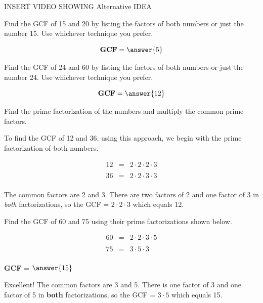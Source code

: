 \documentclass{ximera}[font=12pt]  %
\begin{document}
INSERT VIDEO SHOWING Alternative IDEA


\begin{problem}
Find the GCF of 15 and 20 by listing the factors of both numbers or just the number 15.  Use whichever technique you prefer.

\[ \textbf{GCF} = \answer{5} \]

\end{problem}


\begin{problem}
Find the GCF of 24 and 60 by listing the factors of both numbers or just the number 24.  Use whichever technique you prefer.

\[ \textbf{GCF} = \answer{12} \]

\end{problem}


\begin{procedure}
    
    Find the prime factorization of the numbers and multiply the common prime factors.  
    
\end{procedure}

\begin{example}

 To find the GCF of 12 and 36, using this approach, we begin with the prime factorization of both numbers.

\begin{eqnarray*}
12 &=& 2 \cdot 2 \cdot 2 \cdot 3 \\
   & & \\
36 &=& 2 \cdot 2 \cdot 3 \cdot 3 \\
\end{eqnarray*}

The common factors are 2 and 3.  There are two factors of 2 and one factor of 3 in \textit{both} factorizations, 
so the GCF = $2 \cdot 2 \cdot 3$ which equals 12.
\end{example}

\begin{problem}
Find the GCF of 60 and 75 using their prime factorizations shown below.

\begin{eqnarray*}
60 &=& 2 \cdot 2 \cdot 3 \cdot 5 \\
   & & \\
75 &=& 3 \cdot 5 \cdot 3 \\
\end{eqnarray*}

\textbf{GCF} = $\answer{15}$

\begin{feedback}
Excellent!  The common factors are 3 and 5.  There is one factor of 3 and one factor of 5 in \textbf{both} factorizations, so the GCF = $3 \cdot 5$ which equals 15.
\end{feedback}

\end{problem}
\end{document}

